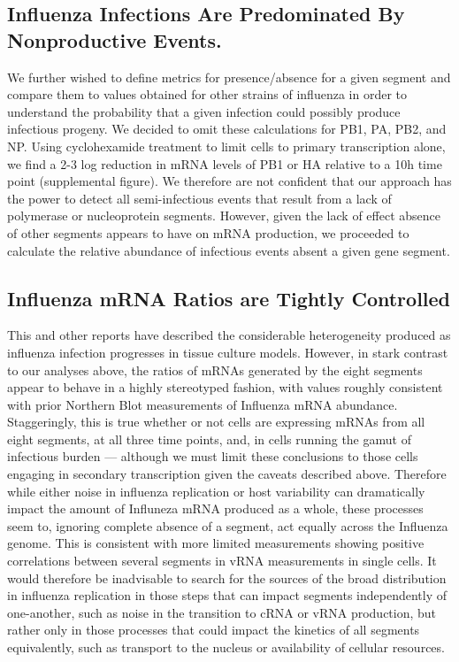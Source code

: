 \documentclass[9pt,lineno]{elife}
\begin{document}
\subsection{Influenza Infections Are Predominated By Nonproductive Events.}
	We further wished to define metrics for presence/absence for a given segment and compare them to values obtained for other strains of influenza in order to understand the probability that a given infection could possibly produce infectious progeny. We decided to omit these calculations for PB1, PA, PB2, and NP. Using cyclohexamide treatment to limit cells to primary transcription alone, we find a 2-3 log reduction in mRNA levels of PB1 or HA relative to a 10h time point (supplemental figure). We therefore are not confident that our approach has the power to detect all semi-infectious events that result from a lack of polymerase or nucleoprotein segments. However, given the lack of effect absence of other segments appears to have on mRNA production, we proceeded to calculate the relative abundance of infectious events absent a given gene segment. 

\subsection{Influenza mRNA Ratios are Tightly Controlled}
	
	This and other reports have described the considerable heterogeneity produced as influenza infection progresses in tissue culture models. However, in stark contrast to our analyses above, the ratios of mRNAs generated by the eight segments appear to behave in a highly stereotyped fashion, with values roughly consistent with prior Northern Blot measurements of Influenza mRNA abundance. Staggeringly, this is true whether or not cells are expressing mRNAs from all eight segments, at all three time points,  and, in cells running the gamut of infectious burden --- although we must limit these conclusions to those cells engaging in secondary transcription given the caveats described above. Therefore while either noise in influenza replication or host variability can dramatically impact the amount of Influneza mRNA produced as a whole, these processes seem to, ignoring complete absence of a segment, act equally across the Influenza genome. This is consistent with more limited measurements showing positive correlations between several segments in vRNA measurements in single cells. It would therefore be inadvisable to search for the sources of the broad distribution in influenza replication in those steps that can impact segments independently of one-another, such as noise in the transition to cRNA or vRNA production, but rather only in those processes that could impact the kinetics of all segments equivalently, such as transport to the nucleus or availability of cellular resources. 
\end{document}

